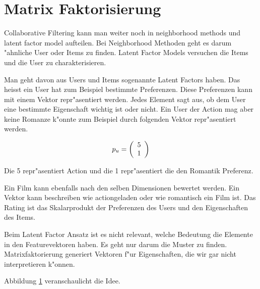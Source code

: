 \documentclass[a4paper, 12pt]{article}
\begin{document}
\section{Matrix Faktorisierung}
\label{sec:matrixfactorization}

Collaborative Filtering kann man weiter noch in neighborhood methods und latent factor model aufteilen. Bei Neighborhood Methoden geht es darum "ahnliche User oder Items zu finden. Latent Factor Models versuchen die Items und die User zu charakterisieren. 

Man geht davon aus Users und Items sogenannte Latent Factors haben. Das heisst ein User hat zum Beispiel bestimmte Preferenzen. Diese Preferenzen kann mit einem Vektor repr"asentiert werden. Jedes Element sagt aus, ob dem User eine bestimmte Eigenschaft wichtig ist oder nicht. Ein User der Action mag aber keine Romanze k"onnte zum Beispiel durch folgenden Vektor repr"asentiert werden.

\begin{equation}
  \label{eq:vektor}
  p_u = \left(
  \begin{array}[c]{c}
    5 \\
    1 
  \end{array}
\right)
\end{equation}

Die 5 repr"asentiert Action und die 1 repr"asentiert die den Romantik Preferenz.

 Ein Film kann ebenfalls nach den selben Dimensionen bewertet werden. Ein Vektor kann beschreiben wie actiongeladen oder wie romantisch ein Film ist. Das Rating ist das Skalarprodukt der Preferenzen des Users und den Eigenschaften des Items.

Beim Latent Factor Ansatz ist es nicht relevant, welche Bedeutung die Elemente in den Featurevektoren haben. Es geht nur darum die Muster zu finden. Matrixfaktorierung generiert Vektoren f"ur Eigenschaften, die wir gar nicht interpretieren k"onnen.

Abbildung \ref{fig:moviedimension} veranschaulicht die Idee.

\begin{figure}
\centering
{}
\label{fig:moviedimension}
\end{figure}
\end{document}
